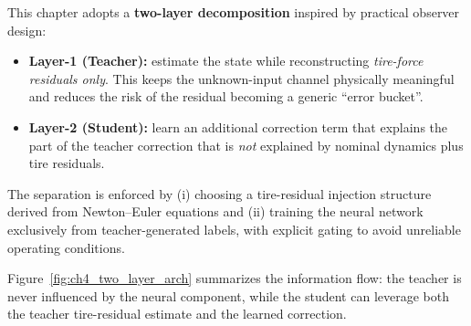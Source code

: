 This chapter adopts a \textbf{two-layer decomposition} inspired by practical observer design:
\begin{itemize}
    \item \textbf{Layer-1 (Teacher):} estimate the state while reconstructing \emph{tire-force residuals only}. This keeps the unknown-input channel physically meaningful and reduces the risk of the residual becoming a generic ``error bucket''.
    \item \textbf{Layer-2 (Student):} learn an additional correction term that explains the part of the teacher correction that is \emph{not} explained by nominal dynamics plus tire residuals.
\end{itemize}
The separation is enforced by (i) choosing a tire-residual injection structure derived from Newton--Euler equations and (ii) training the neural network exclusively from teacher-generated labels, with explicit gating to avoid unreliable operating conditions.

Figure~\ref{fig:ch4_two_layer_arch} summarizes the information flow: the teacher is never influenced by the neural component, while the student can leverage both the teacher tire-residual estimate and the learned correction.

